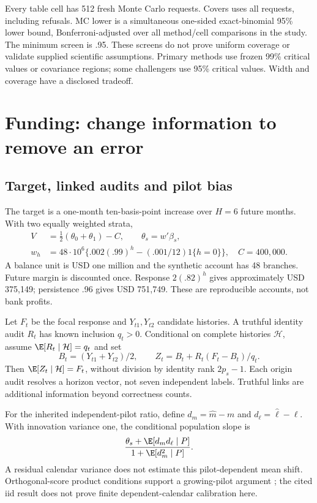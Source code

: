 Every table cell has 512 fresh Monte Carlo requests. Covers uses all requests, including refusals. MC lower is a simultaneous one-sided exact-binomial 95\% lower bound, Bonferroni-adjusted over all method/cell comparisons in the study. The minimum screen is .95. These screens do not prove uniform coverage or validate supplied scientific assumptions. Primary methods use frozen 99\% critical values or covariance regions; some challengers use 95\% critical values. Width and coverage have a disclosed tradeoff.

\section{Funding: change information to remove an error}
\subsection{Target, linked audits and pilot bias}
The target is a one-month ten-basis-point increase over $H=6$ future months. With two equally weighted strata,
\[
 \begin{aligned}
 V&=\tfrac12(\theta_0+\theta_1)-C,\qquad \theta_s=w'\beta_s,\\
 w_h&=48\cdot10^6\{.002(.99)^h-(.001/12)1\{h=0\}\},\quad C=400{,}000.
\end{aligned}
\]
A balance unit is USD one million and the synthetic account has 48 branches. Future margin is discounted once. Response $2(.82)^h$ gives approximately USD 375,149; persistence .96 gives USD 751,749. These are reproducible accounts, not bank profits.

Let $F_t$ be the focal response and $Y_{t1},Y_{t2}$ candidate histories. A truthful identity audit $R_t$ has known inclusion $q_t>0$. Conditional on complete histories $\mathcal H$, assume $\E[R_t\mid\mathcal H]=q_t$ and set
\[
 B_t=(Y_{t1}+Y_{t2})/2,\qquad Z_t=B_t+R_t(F_t-B_t)/q_t.
\]
Then $\E[Z_t\mid\mathcal H]=F_t$, without division by identity rank $2p_s-1$. Each origin audit resolves a horizon vector, not seven independent labels. Truthful links are additional information beyond correctness counts.

For the inherited independent-pilot ratio, define $d_m=\widehat m-m$ and $d_\ell=\widehat\ell-\ell$. With innovation variance one, the conditional population slope is
\[
 \frac{\theta_s+\E[d_md_\ell\mid P]}{1+\E[d_m^2\mid P]}.
\]
A residual calendar variance does not estimate this pilot-dependent mean shift. Orthogonal-score product conditions support a growing-pilot argument \cite{dml2018}; the cited iid result does not prove finite dependent-calendar calibration here.

